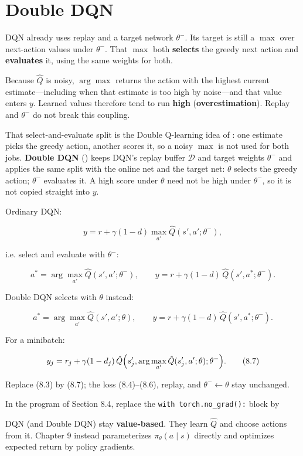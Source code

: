 


\section{Double DQN}

DQN already uses replay and a target network $\theta^-$. Its target is still a $\max$ over next-action values under $\theta^-$. That $\max$ both \textbf{selects} the greedy next action and \textbf{evaluates} it, using the same weights for both.

Because $\hat{Q}$ is noisy, $\arg\max$ returns the action with the highest current estimate---including when that estimate is too high by noise---and that value enters $y$. Learned values therefore tend to run \textbf{high} (\textbf{overestimation}). Replay and $\theta^-$ do not break this coupling.

That select-and-evaluate split is the Double Q-learning idea of : one estimate picks the greedy action, another scores it, so a noisy $\max$ is not used for both jobs. \textbf{Double DQN} () keeps DQN's replay buffer $\mathcal{D}$ and target weights $\theta^-$ and applies the same split with the online net and the target net: $\theta$ selects the greedy action; $\theta^-$ evaluates it. A high score under $\theta$ need not be high under $\theta^-$, so it is not copied straight into $y$.

Ordinary DQN:

\[
y
=
r
+
\gamma(1-d)\max_{a'}\hat{Q}(s',a';\theta^-),
\]

i.e. select and evaluate with $\theta^-$:

\[
a^*
=
\arg\max_{a'}\hat{Q}(s',a';\theta^-),
\qquad
y
=
r
+
\gamma(1-d)\,\hat{Q}(s',a^*;\theta^-).
\]

Double DQN selects with $\theta$ instead:

\[
a^*
=
\arg\max_{a'}\hat{Q}(s',a';\theta),
\qquad
y
=
r
+
\gamma(1-d)\,\hat{Q}(s',a^*;\theta^-).
\]

For a minibatch:

\begin{equation}
y_j
=
r_j
+
\gamma(1-d_j)\,
\hat{Q}\Bigl(
s'_j,
\arg\max_{a'}\hat{Q}(s'_j,a';\theta);
\theta^-
\Bigr).
\tag{8.7}
\end{equation}

Replace (8.3) by (8.7); the loss (8.4)--(8.6), replay, and $\theta^-\leftarrow\theta$ stay unchanged.

In the program of Section 8.4, replace the \texttt{with torch.no\_grad():} block by




DQN (and Double DQN) stay \textbf{value-based}. They learn $\hat{Q}$ and choose actions from it. Chapter 9 instead parameterizes $\pi_\theta(a\mid s)$ directly and optimizes expected return by policy gradients.
